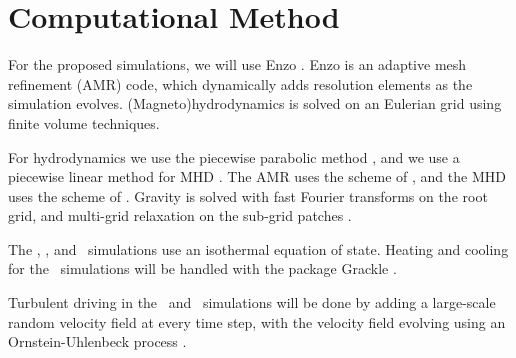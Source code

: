 \section{Computational Method}
\label{sec.method}

For the proposed simulations, we will use Enzo \citep{Collins10, Bryan14}.  Enzo
is an adaptive mesh refinement (AMR) code, which dynamically adds resolution
elements as the simulation evolves.  (Magneto)hydrodynamics is solved on an Eulerian grid
using finite volume techniques.  

For hydrodynamics we use the
piecewise parabolic method \citep{Colella84}, and we use a piecewise linear
method for MHD \citep{Li08a}.  The AMR uses the scheme of \citet{Berger89}, and
the MHD uses the scheme of \citet{Balsara01}.  Gravity is solved with fast
Fourier transforms on the root grid, and multi-grid relaxation on the sub-grid
patches \citep{Bryan14}.  

The \nameTurbulence, \nameCores, and  \nameCMB\ simulations use an isothermal
equation of state.  Heating and cooling for the \nameGalaxies\ simulations will
be handled with the package Grackle \citep{Smith17}.

Turbulent driving in the \nameTurbulence\ and \nameCMB\ simulations will be
done by adding a large-scale random velocity field at every time step, with the
velocity field evolving using an Ornstein-Uhlenbeck process \citep{Schmidt09}.




